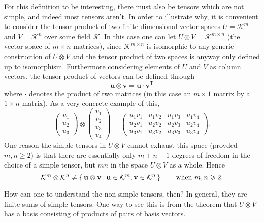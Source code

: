 \documentclass[12pt]{article}
\theoremstyle{definition}
\newcommand{\vek}[1]{\mathbf{#1}}
\newcommand{\K}{\mathcal{K}}
\newcommand{\gobble}[1]{}
\newcommand*{\setOf}[3][\gobble]{%
   \left\{ \, #2 \,\,\vrule\relax#1.\,\, #3 \, \right\}%
}
\begin{document}
For this definition to be interesting, there must also be tensors 
which are not simple, and indeed most tensors aren't. In order to 
illustrate why, it is convenient to consider the tensor product of 
two finite-dimensional vector spaces \(U = \K^m\) and \(V = \K^n\) 
over some field $\K$. In this case one can let \(U \otimes V = 
\K^{m \times n}\) (the vector space of $m \times n$ matrices), since 
$\K^{m \times n}$ is isomorphic to any generic construction of 
$U \otimes V$ and the tensor product of two spaces is anyway only 
defined up to isomorphism. Furthermore considering elements of $U$ 
and $V$ as column vectors, the tensor product of vectors can be 
defined through
\begin{equation*}
  \vek{u} \otimes \vek{v} = \vek{u} \cdot \vek{v}^{\mathrm{T}}
\end{equation*}
where $\cdot$ denotes the product of two matrices (in this case an 
$m \times 1$ matrix by a $1 \times n$ matrix). As a very concrete 
example of this,
\begin{equation*}
  \begin{pmatrix} u_1 \\ u_2 \\ u_3 \end{pmatrix} \otimes
  \begin{pmatrix} v_1 \\ v_2 \\ v_3 \\ v_4 \end{pmatrix} =
  \begin{pmatrix}
    u_1v_1 & u_1v_2 & u_1v_3 & u_1v_4 \\
    u_2v_1 & u_2v_2 & u_2v_3 & u_2v_4 \\
    u_3v_1 & u_3v_2 & u_3v_3 & u_3v_4 
  \end{pmatrix}
  \text{.}
\end{equation*}
One reason the simple tensors in $U \otimes V$ cannot exhaust this 
space (provded \(m,n \geqslant 2\)) is that there are essentially 
only $m+n-1$ degrees of freedom in the choice of a simple tensor, but 
$mn$  in the space $U \otimes V$ 
as a whole. Hence
\begin{equation*}
  \K^m \otimes \K^n \neq 
  \setOf{ \vek{u} \otimes \vek{v} }{ \vek{u} \in \K^m, \vek{v} \in \K^n}
  \qquad\text{when \(m,n \geqslant 2\).}
\end{equation*}

How can one to understand the non-simple tensors, then? In general, 
they are finite sums of simple tensors. One way to see this is from 
the theorem that $U \otimes V$ has a basis consisting of products of 
pairs of basis vectors.
\end{document}
